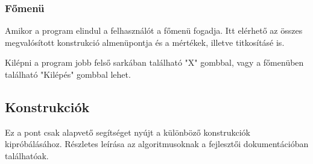 \documentclass[12pt]{article}
\begin{document}
	\subsubsection{Főmenü}
	Amikor a program elindul a felhasználót a főmenü fogadja. Itt elérhető az összes megvalósított konstrukció almenüpontja és a mértékek, illetve titkosításé is.
	
	Kilépni a program jobb felső sarkában található "X" gombbal, vagy a főmenüben található "Kilépés" gombbal lehet.
	\subsection*{Konstrukciók}
	Ez a pont csak alapvető segítséget nyújt a különböző konstrukciók kipróbálásához. Részletes leírása az algoritmusoknak a fejlesztői dokumentációban találhatóak.
	\par
\end{document}

